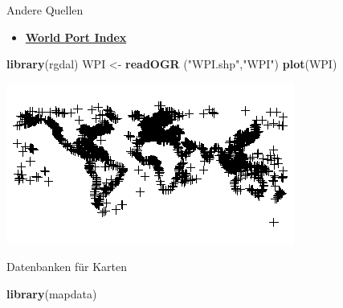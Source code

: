 \documentclass[ignorenonframetext,]{beamer}
\newenvironment{Shaded}{\begin{snugshade}}{\end{snugshade}}
\newcommand{\KeywordTok}[1]{\textcolor[rgb]{0.13,0.29,0.53}{\textbf{#1}}}
\newcommand{\StringTok}[1]{\textcolor[rgb]{0.31,0.60,0.02}{#1}}
\newcommand{\NormalTok}[1]{#1}
\providecommand{\tightlist}{%
  \setlength{\itemsep}{0pt}\setlength{\parskip}{0pt}}
\begin{document}
\begin{frame}[fragile]{Andere Quellen}

\begin{itemize}
\tightlist
\item
  \href{http://msi.nga.mil/NGAPortal/MSI.portal?_nfpb=true\&_pageLabel=msi_portal_page_62\&pubCode=0015}{\textbf{World
  Port Index}}
\end{itemize}

\begin{Shaded}
\begin{Highlighting}[]
\KeywordTok{library}\NormalTok{(rgdal)}
\NormalTok{WPI <-}\StringTok{ }\KeywordTok{readOGR}\NormalTok{ (}\StringTok{"WPI.shp"}\NormalTok{,}\StringTok{"WPI"}\NormalTok{)}
\KeywordTok{plot}\NormalTok{(WPI)}
\end{Highlighting}
\end{Shaded}

\includegraphics{figure/WPI.png}

Datenbanken für Karten

\begin{Shaded}
\begin{Highlighting}[]
\KeywordTok{library}\NormalTok{(mapdata)}
\end{Highlighting}
\end{Shaded}

\end{frame}
\end{document}
